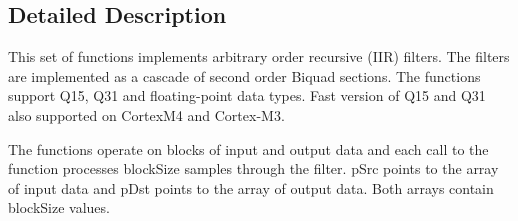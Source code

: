\subsection{Detailed Description}
This set of functions implements arbitrary order recursive (I\-I\-R) filters. The filters are implemented as a cascade of second order Biquad sections. The functions support Q15, Q31 and floating-\/point data types. Fast version of Q15 and Q31 also supported on Cortex\-M4 and Cortex-\/\-M3.

The functions operate on blocks of input and output data and each call to the function processes {\ttfamily block\-Size} samples through the filter. {\ttfamily p\-Src} points to the array of input data and {\ttfamily p\-Dst} points to the array of output data. Both arrays contain {\ttfamily block\-Size} values.

